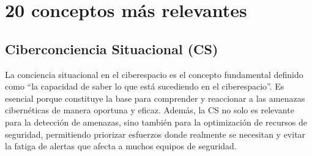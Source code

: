 \chapter{20 conceptos más relevantes}

\section{Ciberconciencia Situacional (CS)}
La conciencia situacional en el ciberespacio es el concepto fundamental definido como ``la capacidad de saber lo que está sucediendo en el ciberespacio''. Es esencial porque constituye la base para comprender y reaccionar a las amenazas cibernéticas de manera oportuna y eficaz. 
Además, la CS no solo es relevante para la detección de amenazas, sino también para la optimización de recursos de seguridad, permitiendo priorizar esfuerzos donde realmente se necesitan y evitar la fatiga de alertas que afecta a muchos equipos de seguridad.

